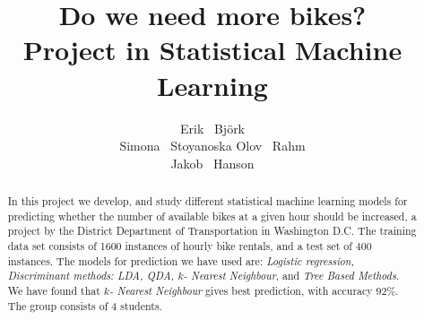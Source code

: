 \documentclass{article}
\title{Do we need more bikes?\\
Project in Statistical Machine Learning}
\author{
  Erik ~Björk\\
  \AND
  Simona ~Stoyanoska
  \AND
  Olov ~Rahm\\
  \AND
  Jakob ~Hanson\\
}
\begin{document}
\maketitle

\begin{abstract}
  In this project we develop, and study different statistical machine learning models for predicting whether the number of available bikes 
  at a given hour should be increased, a project by the District Department of Transportation in Washington D.C. The training data set consists 
  of 1600 instances of hourly bike rentals, and a test set of 400 instances. The models for prediction we have used are: 
  \emph{Logistic regression, Discriminant methods: LDA, QDA, $k$- Nearest Neighbour}, and \emph{Tree Based Methods}. 
  We have found that \emph{$k$- Nearest Neighbour} gives best prediction, with accuracy $92\%$.\\
  The group consists of 4 students.
\end{abstract}
\pagebreak










\appendix


\end{document}
